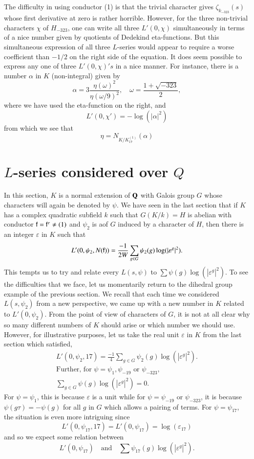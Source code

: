 The difficulty in using conductor (1) is that the trivial character gives $\zeta_{k_{-323}} (s)$ whose first derivative at zero is rather horrible. However, for the three non-trivial characters $\chi$ of $H_{-323}$, one can write all three $L' (0, \chi)$ simultaneously in terms of a nice number given by quotients of Dedekind eta-functions. But this simultaneous expression of all three $L$-series would appear to require a worse coefficient than $-1/2$ on the right side of the equation. It does seem possible to express any one of three $L' (0, \chi)'s$ in a nice manner. For instance, there is a number $\alpha$ in $K$ (non-integral) given by
$$
\alpha = 3 \frac{\eta(\omega)^2}{\eta(\omega/9)^2}, \quad \omega = \frac{1+\sqrt{-323}}{2},
$$
where we have used the eta-function on the right, and 
$$
L' (0, \chi') = - \log (|\alpha|^2)
$$
from which we see that 
$$
\eta = N_{K/K^{(1)}_{17}} (\alpha)
$$

\section{$L$-series considered over $Q$}\label{art9-sec3} 

In this section, $K$ is a normal extension of $\mathbf{Q}$ with Galois group $G$ whose characters will again be denoted by $\psi$. We have seen in the last section that if $K$ has a complex quadratic subfield $k$ such that $G (K/k) = H$ is abelian with conductor $\mathsf{f} = \mathsf{f}^\tau \neq (1)$ and $\psi_2$ is a\pageoriginale of $G$ induced by a character of $H$, then there is an integer $\varepsilon$ in $K$ such that 
$$
L'(0, \psi_2, N (\mathsf{f})) =\frac{-1}{2W} \sum\limits_{g \in G} \psi_2 (g) \log (|\varepsilon^g|^2).
$$
This tempts us to try and relate every $L (s, \psi)$ to $\sum \psi (g) \log (|\varepsilon^g|^2)$.
To see the difficulties that we face, let us momentarily return to the dihedral group example of the previous section. We recall that each time we considered $L(s, \psi_2)$ from a new perspective, we came up with a new number in $K$ related to $L' (0, \psi_2)$. From  the point of view of characters of $G$, it is not at all clear why so many different numbers of $K$ should arise or which number we should use. However, for illustrative purposes, let us take the real unit $\varepsilon$ in $K$ from the last section which satisfied,
\begin{gather*}
L' (0, \psi_2, 17) = \frac{-1}{4} \sum\limits_{g \in G} \psi_2 (g) \log (|\varepsilon^g|^2).\\
\text{Further, for } \psi = \psi_1, \psi_{-19} \text{ or } \psi_{-323},\\
\sum\limits_{g \in G} \psi (g) \log (|\varepsilon^g|^2) = 0.
\end{gather*}
For $\psi = \psi_1$, this is because $\varepsilon$ is a unit while for $\psi = \psi_{-19}$ or $\psi_{-323}$, it is because $\psi (g\tau) = - \psi (g)$ for all $g$ in $G$ which allows a pairing of terms. For $\psi = \psi_{17}$, the situation is even more intriguing since 
$$
L' (0, \psi_{17}, 17) = L' (0, \psi_{17}) = \log (\varepsilon_{17})
$$
and so we expect some relation between 
$$
L' (0, \psi_{17})\quad\text{and}\quad \sum \psi_{17} (g) \log (|\varepsilon^g|^2).
$$

